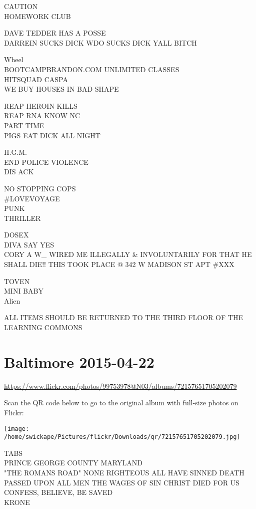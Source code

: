 \documentclass[10pt,letterpaper]{article}
\begin{document}
CAUTION\\
HOMEWORK CLUB

DAVE TEDDER HAS A POSSE\\
DARREIN SUCKS DICK WDO SUCKS DICK YALL BITCH

Wheel\\
BOOTCAMPBRANDON.COM UNLIMITED CLASSES\\
HITSQUAD CASPA\\
WE BUY HOUSES IN BAD SHAPE

REAP HEROIN KILLS\\
REAP RNA KNOW NC\\
PART TIME\\
PIGS EAT DICK ALL NIGHT

H.G.M.\\
END POLICE VIOLENCE\\
DIS ACK

NO STOPPING COPS\\
\#LOVEVOYAGE\\
PUNK\\
THRILLER

DOSEX\\
DIVA SAY YES\\
CORY A W\_ WIRED ME ILLEGALLY \& INVOLUNTARILY FOR THAT HE SHALL DIE!! THIS TOOK PLACE @ 342 W MADISON ST APT \#XXX

TOVEN\\
MINI BABY\\
Alien

ALL ITEMS SHOULD BE RETURNED TO THE THIRD FLOOR OF THE LEARNING COMMONS
\pagebreak

\section*{Baltimore 2015-04-22}

\url{https://www.flickr.com/photos/99753978@N03/albums/72157651705202079}

Scan the QR code below to go to the original album with full-size photos on Flickr:

\texttt{[image: /home/swickape/Pictures/flickr/Downloads/qr/72157651705202079.jpg]}
\pagebreak

TABS\\
PRINCE GEORGE COUNTY MARYLAND\\
"THE ROMANS ROAD" NONE RIGHTEOUS ALL HAVE SINNED DEATH PASSED UPON ALL MEN THE WAGES OF SIN CHRIST DIED FOR US CONFESS, BELIEVE, BE SAVED\\
KRONE
\end{document}
